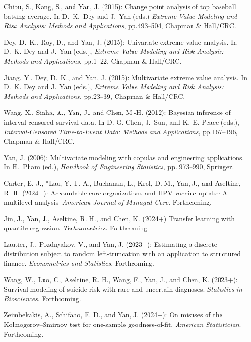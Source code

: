 \documentclass[Statistics]{vita}
\begin{document}
\begin{vita}
\begin{Publications}
\begin{BookChapters}
  \item *Chiou, S., Kang, S., and Yan, J. (2015): Change point analysis of top baseball batting average. In D.~K.~Dey and J.~Yan (eds.) {\em Extreme Value Modeling and Risk Analysis: Methods and Applications\/}, pp.493--504, Chapman \& Hall/CRC.
  \item Dey, D.~K., Roy, D., and Yan, J. (2015): Univariate extreme value analysis. In D.~K. Dey and J.~Yan (eds.), {\em Extreme Value Modeling and Risk Analysis: Methods and Applications\/}, pp.1--22, Chapman \& Hall/CRC.
  \item *Jiang, Y., Dey, D.~K., and Yan, J. (2015): Multivariate extreme value analysis. In D.~K. Dey and J.~Yan (eds.), {\em Extreme Value Modeling and Risk Analysis: Methods and Applications\/}, pp.23--39, Chapman \& Hall/CRC.
  \item *Wang, X., Sinha, A., Yan, J., and Chen, M.-H. (2012): Bayesian inference of interval-censored survival data. In D.-G. Chen, J.~Sun, and  K.~E. Peace (eds.), {\em Interval-Censored Time-to-Event Data: {M}ethods and Applications\/}, pp.167--196, Chapman \& Hall/CRC.
  \item Yan, J. (2006): Multivariate modeling with copulas and engineering applications. In H.~Pham (ed.), {\em Handbook of Engineering Statistics\/}, pp. 973--990, Springer.
  \end{BookChapters}
  \begin{RefereedJournalArticles}
  \item Carter, E. J., *Lau, Y. T. A., Buchanan, L., Krol, D. M., Yan, J., and Aseltine, R. H. (2024+): Accountable care organizations and {HPV} vaccine uptake: A multilevel analysis. {\em American Journal of Managed Care\/}. Forthcoming. 
  \item *Jin, J., Yan, J., Aseltine, R. H., and Chen, K. (2024+) Transfer learning with quantile regression. {\em Technometrics\/}. Forthcoming.
  \item *Lautier, J., Pozdnyakov, V., and Yan, J. (2023+): Estimating a discrete distribution subject to random left-truncation with an application to structured finance. {\em Econometrics and Statistics\/}. Forthcoming. 
  \item *Wang, W., Luo, C., Aseltine, R. H., Wang, F., Yan, J., and Chen, K. (2023+): Survival modeling of suicide risk with rare and uncertain diagnoses. {\em Statistics in Biosciences\/}. Forthcoming.
  \item *Zeimbekakis, A., Schifano, E. D., and Yan, J. (2024+): On misuses of the Kolmogorov--Smirnov test for one-sample goodness-of-fit. {\em American Statistician\/}. Forthcoming.

\end{RefereedJournalArticles}
\end{Publications}
\end{vita}
\end{document}
